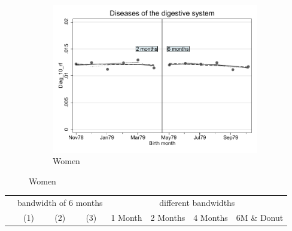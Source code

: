 \documentclass[a4paper ]{article}
\begin{document}
\begin{figure}[h]
\begin{subfigure}[t]{0.31\textwidth}
		\centering
		\includegraphics[width=0.99\textwidth]{R1_RD_Diag_10_rf_fits}
		\caption{Women}
	\end{subfigure}
\end{figure}


\begin{table}[h]\centering
\def\sym#1{\ifmmode^{#1}\else\(^{#1}\)\fi}
\begin{tabular}{l*{3}{c}|cccc}
\toprule
&\multicolumn{3}{c}{bandwidth of 6 months} & \multicolumn{4}{c}{different bandwidths} \\
 \cmidrule(lr{1em}){2-4} \cmidrule(lr{1em}){5-8}
 &\multicolumn{1}{c}{(1)}&\multicolumn{1}{c}{(2)}&\multicolumn{1}{c}{(3)}& 1 Month & 2 Months & 4 Months & 6M \& Donut \\
\midrule 

\bottomrule
\end{tabular}
\end{table}
\end{document}
